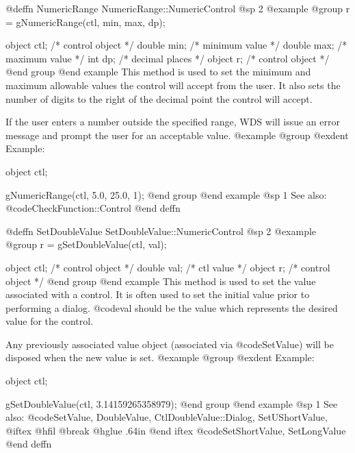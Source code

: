 @deffn {NumericRange} NumericRange::NumericControl
@sp 2
@example
@group
r = gNumericRange(ctl, min, max, dp);

object  ctl;   /*  control object  */
double  min;   /*  minimum value   */
double  max;   /*  maximum value   */
int     dp;    /*  decimal places  */
object  r;     /*  control object  */
@end group
@end example
This method is used to set the minimum and maximum allowable values
the control will accept from the user.  It also sets the number of
digits to the right of the decimal point the control will accept.

If the user enters a number outside the specified range, WDS will
issue an error message and prompt the user for an acceptable value.
@example
@group
@exdent Example:

object  ctl;

gNumericRange(ctl, 5.0, 25.0, 1);
@end group
@end example
@sp 1
See also:  @code{CheckFunction::Control}
@end deffn














@deffn {SetDoubleValue} SetDoubleValue::NumericControl
@sp 2
@example
@group
r = gSetDoubleValue(ctl, val);

object  ctl;    /*  control object  */
double  val;    /*  ctl value       */
object  r;      /*  control object  */
@end group
@end example
This method is used to set the value associated with a control.  It is
often used to set the initial value prior to performing a dialog.
@code{val} should be the value which represents the desired value for
the control.

Any previously associated value object (associated via @code{SetValue})
will be disposed when the new value is set.
@example
@group
@exdent Example:

object  ctl;

gSetDoubleValue(ctl, 3.14159265358979);
@end group
@end example
@sp 1
See also:  @code{SetValue, DoubleValue, CtlDoubleValue::Dialog, SetUShortValue,}
@iftex
@hfil @break @hglue .64in   
@end iftex
@code{SetShortValue, SetLongValue}
@end deffn















